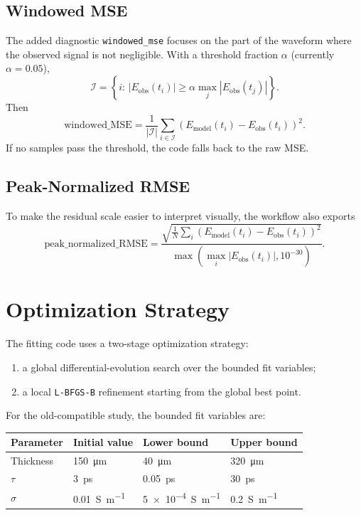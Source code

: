 \documentclass[11pt]{article}
\begin{document}
\subsection{Windowed MSE}
The added diagnostic \texttt{windowed\_mse} focuses on the part of the waveform where the
observed signal is not negligible. With a threshold fraction \(\alpha\) (currently
\(\alpha=0.05\)),
\[
\mathcal{I}
=
\left\{i:\, |E_{\mathrm{obs}}(t_i)| \ge \alpha \max_j |E_{\mathrm{obs}}(t_j)|\right\}.
\]
Then
\[
\mathrm{windowed\_MSE}
=
\frac{1}{|\mathcal{I}|}
\sum_{i\in\mathcal{I}}
\left(E_{\mathrm{model}}(t_i)-E_{\mathrm{obs}}(t_i)\right)^2.
\]
If no samples pass the threshold, the code falls back to the raw MSE.

\subsection{Peak-Normalized RMSE}
To make the residual scale easier to interpret visually, the workflow also exports
\[
\mathrm{peak\_normalized\_RMSE}
=
\frac{\sqrt{\frac{1}{N}\sum_i \left(E_{\mathrm{model}}(t_i)-E_{\mathrm{obs}}(t_i)\right)^2}}
{\max\!\left(\max_i |E_{\mathrm{obs}}(t_i)|,10^{-30}\right)}.
\]

\section{Optimization Strategy}
The fitting code uses a two-stage optimization strategy:
\begin{enumerate}[leftmargin=2em]
\item a global differential-evolution search over the bounded fit variables;
\item a local \texttt{L-BFGS-B} refinement starting from the global best point.
\end{enumerate}
For the old-compatible study, the bounded fit variables are:
\begin{center}
\begin{tabular}{llll}
\toprule
Parameter & Initial value & Lower bound & Upper bound \\
\midrule
Thickness & \SI{150}{\micro\meter} & \SI{40}{\micro\meter} & \SI{320}{\micro\meter} \\
\(\tau\) & \SI{3}{\pico\second} & \SI{0.05}{\pico\second} & \SI{30}{\pico\second} \\
\(\sigma\) & \SI{0.01}{\siemens\per\meter} & \SI{5e-4}{\siemens\per\meter} & \SI{0.2}{\siemens\per\meter} \\
\bottomrule
\end{tabular}
\end{center}
\end{document}
